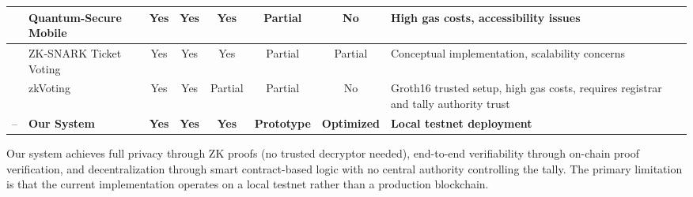 \documentclass[12pt, a4paper]{report}
\begin{document}
\begin{landscape}
\begin{table}[p]
\begin{adjustbox}{max width=\linewidth}
\begin{tabular}{|c|m{3.5cm}|c|c|c|c|c|m{4.5cm}|}
\cite{poudel2025quantum_blockchain_evoting} & Quantum-Secure Mobile & Yes & Yes & Yes & Partial & No & High gas costs, accessibility issues \\ \hline

\cite{rabia2024zksnark} & ZK-SNARK Ticket Voting & Yes & Yes & Yes & Partial & Partial & Conceptual implementation, scalability concerns \\ \hline

\cite{park2024zkvoting} & zkVoting & Yes & Yes & Partial & Partial & No & Groth16 trusted setup, high gas costs, requires registrar and tally authority trust \\ \hline

-- & \textbf{Our System} & \textbf{Yes} & \textbf{Yes} & \textbf{Yes} & \textbf{Prototype} & \textbf{Optimized} & \textbf{Local testnet deployment} \\ \hline

\end{tabular}
\end{adjustbox}
\end{table}
\end{landscape}

Our system achieves full privacy through ZK proofs (no trusted decryptor needed), end-to-end verifiability through on-chain proof verification, and decentralization through smart contract-based logic with no central authority controlling the tally. The primary limitation is that the current implementation operates on a local testnet rather than a production blockchain.

\newpage
\end{document}
